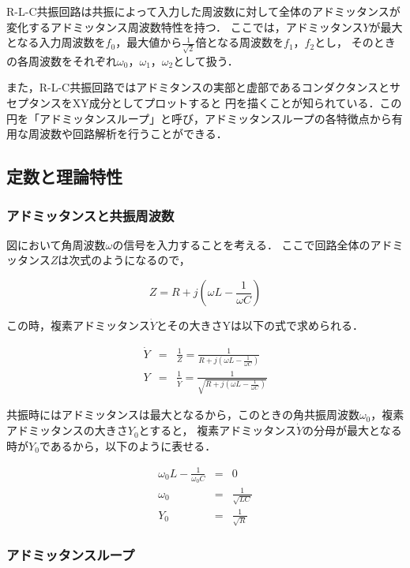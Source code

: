 \documentclass[dvipdfmx,titlepage,a4j]{jsarticle}  %
\numberwithin{equation}{section}
\begin{document}
R-L-C共振回路は共振によって入力した周波数に対して全体のアドミッタンスが変化するアドミッタンス周波数特性を持つ．
ここでは，アドミッタンス$Y$が最大となる入力周波数を$f_0$，最大値から$\frac{1}{\sqrt{2}}$倍となる周波数を$f_1$，$f_2$とし，
そのときの各周波数をそれぞれ$\omega_0$，$\omega_1$，$\omega_2$として扱う．

また，R-L-C共振回路ではアドミタンスの実部と虚部であるコンダクタンスとサセプタンスをXY成分としてプロットすると
円を描くことが知られている．この円を「アドミッタンスループ」と呼び，アドミッタンスループの各特徴点から有用な周波数や回路解析を行うことができる．

\subsection{定数と理論特性}
\subsubsection{アドミッタンスと共振周波数}
図において角周波数$\omega$の信号を入力することを考える．
ここで回路全体のアドミッタンス$Z$は次式のようになるので，

\begin{equation}
  Z = R + j(\omega L - \frac{1}{\omega C})
\end{equation}

この時，複素アドミッタンス$\dot{Y}$とその大きさYは以下の式で求められる．

\begin{eqnarray}
  \dot{Y} &=& \frac{1}{Z} = \frac{1}{R + j(\omega L - \frac{1}{\omega C})} \\
  Y &=& \frac{1}{\dot{Y}} = \frac{1}{\sqrt{R + j(\omega L - \frac{1}{\omega C})}}
\end{eqnarray}

共振時にはアドミッタンスは最大となるから，このときの角共振周波数$\omega_0$，複素アドミッタンスの大きさ$Y_0$とすると，
複素アドミッタンス$\dot{Y}$の分母が最大となる時が$Y_0$であるから，以下のように表せる．

\begin{eqnarray}
  \omega_0 L - \frac{1}{\omega_0 C} &=& 0 \\
  \omega_0 &=& \frac{1}{\sqrt{LC}} \\
  Y_0 &=& \frac{1}{\sqrt{R}}
\end{eqnarray}

\subsubsection{アドミッタンスループ}
\end{document}
